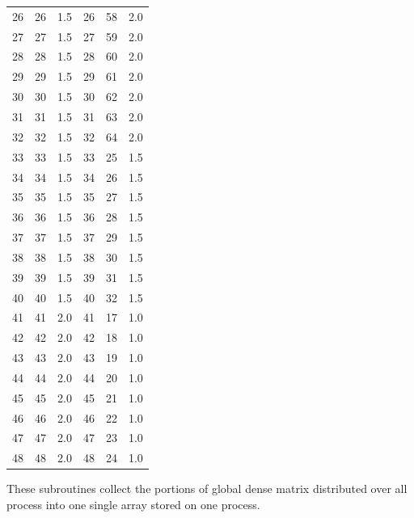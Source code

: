 \begin{table}
\begin{center}
\begin{tabular}{rrr@{\hspace{6\tabcolsep}}rrr}
 26   &   26  &  1.5   &  26  &  58  &   2.0 \\
 27   &   27  &  1.5   &  27  &  59  &   2.0 \\
 28   &   28  &  1.5   &  28  &  60  &   2.0 \\
 29   &   29  &  1.5   &  29  &  61  &   2.0 \\
 30   &   30  &  1.5   &  30  &  62  &   2.0 \\
 31   &   31  &  1.5   &  31  &  63  &   2.0 \\
 32   &   32  &  1.5   &  32  &  64  &   2.0 \\
 33   &   33  &  1.5   &  33  &  25  &   1.5 \\
 34   &   34  &  1.5   &  34  &  26  &   1.5 \\
 35   &   35  &  1.5   &  35  &  27  &   1.5 \\
 36   &   36  &  1.5   &  36  &  28  &   1.5 \\
 37   &   37  &  1.5   &  37  &  29  &   1.5 \\
 38   &   38  &  1.5   &  38  &  30  &   1.5 \\
 39   &   39  &  1.5   &  39  &  31  &   1.5 \\
 40   &   40  &  1.5   &  40  &  32  &   1.5 \\
 41   &   41  &  2.0   &  41  &  17  &   1.0 \\
 42   &   42  &  2.0   &  42  &  18  &   1.0 \\
 43   &   43  &  2.0   &  43  &  19  &   1.0 \\
 44   &   44  &  2.0   &  44  &  20  &   1.0 \\
 45   &   45  &  2.0   &  45  &  21  &   1.0 \\
 46   &   46  &  2.0   &  46  &  22  &   1.0 \\
 47   &   47  &  2.0   &  47  &  23  &   1.0 \\
 48   &   48  &  2.0   &  48  &  24  &   1.0 \\
\end{tabular}
\end{center}
\end{table}



%
%


These subroutines collect the portions of global dense matrix
distributed over all process into one single array stored on one
process.

